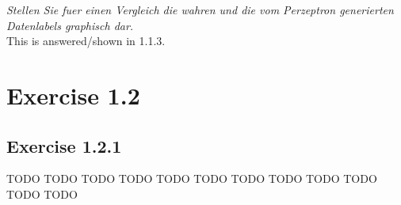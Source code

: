 \documentclass[12pt]{article}
\begin{document}
\textit{Stellen Sie fuer einen Vergleich die wahren und die vom Perzeptron generierten Datenlabels graphisch dar.}
\\
This is answered/shown in 1.1.3.

\section{Exercise 1.2}
\subsection{Exercise 1.2.1}
TODO TODO TODO TODO TODO TODO TODO TODO TODO TODO TODO TODO
\end{document}

